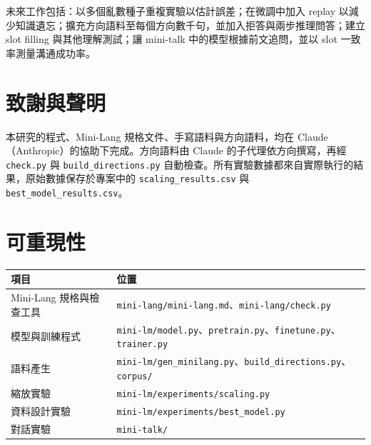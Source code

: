\documentclass[11pt,a4paper]{article}
\begin{document}
未來工作包括：以多個亂數種子重複實驗以估計誤差；在微調中加入 replay 以減少知識遺忘；擴充方向語料至每個方向數千句，並加入拒答與兩步推理問答；建立 slot filling 與其他理解測試；讓 mini-talk 中的模型根據前文追問，並以 slot 一致率測量溝通成功率。

\section*{致謝與聲明}

本研究的程式、Mini-Lang 規格文件、手寫語料與方向語料，均在 Claude（Anthropic）的協助下完成。方向語料由 Claude 的子代理依方向撰寫，再經 \texttt{check.py} 與 \texttt{build\_directions.py} 自動檢查。所有實驗數據都來自實際執行的結果，原始數據保存於專案中的 \texttt{scaling\_results.csv} 與 \texttt{best\_model\_results.csv}。

\section*{可重現性}

\begin{table}[H]
\centering
\small
\begin{tabularx}{\linewidth}{lY}
\toprule
項目 & 位置 \\
\midrule
Mini-Lang 規格與檢查工具 & \texttt{mini-lang/mini-lang.md}、\texttt{mini-lang/check.py} \\
模型與訓練程式 & \texttt{mini-lm/model.py}、\texttt{pretrain.py}、\texttt{finetune.py}、\texttt{trainer.py} \\
語料產生 & \texttt{mini-lm/gen\_minilang.py}、\texttt{build\_directions.py}、\texttt{corpus/} \\
縮放實驗 & \texttt{mini-lm/experiments/scaling.py} \\
資料設計實驗 & \texttt{mini-lm/experiments/best\_model.py} \\
對話實驗 & \texttt{mini-talk/} \\
\bottomrule
\end{tabularx}
\end{table}
\end{document}
